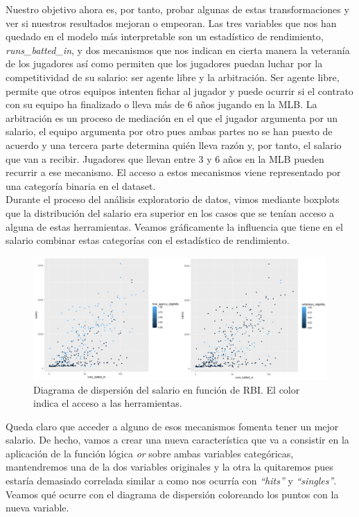 \documentclass[a4paper,12pt, oneside]{book}
\begin{document}
Nuestro objetivo ahora es, por tanto, probar algunas de estas transformaciones y ver si nuestros resultados mejoran o empeoran. Las tres variables que nos han quedado en el modelo más interpretable son un estadístico de rendimiento, \textit{runs\_batted\_in}, y dos mecanismos que nos indican en cierta manera la veteranía de los jugadores así como permiten que los jugadores puedan luchar por la competitividad de su salario: ser agente libre y la arbitración. Ser agente libre, permite que otros equipos intenten fichar al jugador y puede ocurrir si el contrato con su equipo ha finalizado o lleva más de 6 años jugando en la MLB. La arbitración es un proceso de mediación en el que el jugador argumenta por un salario, el equipo argumenta por otro pues ambas partes no se han puesto de acuerdo y una tercera parte determina quién lleva razón y, por tanto, el salario que van a recibir. Jugadores que llevan entre 3 y 6 años en la MLB pueden recurrir a ese mecanismo. El acceso a estos mecanismos viene representado por una categoría binaria en el dataset.\\


Durante el proceso del análisis exploratorio de datos, vimos mediante boxplots que la distribución del salario era superior en los casos que se tenían acceso a alguna de estas herramientas. Veamos gráficamente la influencia que tiene en el salario combinar estas categorías con el estadístico de rendimiento.

\begin{figure}[H]
\centering
\includegraphics[scale=0.4]{images/rbi_agency.png}
\caption{Diagrama de dispersión del salario en función de RBI. El color indica el acceso a las herramientas.}
\end{figure}

Queda claro que acceder a alguno de esos mecanismos fomenta tener un mejor salario. De hecho, vamos a crear una nueva característica que va a consistir en la aplicación de la función lógica \textit{or} sobre ambas variables categóricas, mantendremos una de la dos variables originales y la otra la quitaremos pues estaría demasiado correlada similar a como nos ocurría con \textit{``hits''} y \textit{``singles''}. Veamos qué ocurre con el diagrama de dispersión coloreando los puntos con la nueva variable.
\end{document}
